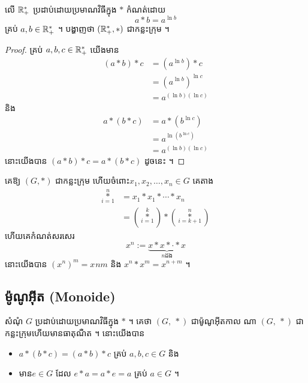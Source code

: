 \begin{example}
លើ $\mathbb{R}^{\ast}_{+}$ ប្រដាប់ដោយប្រមាណវិធីក្នុង $\ast$ កំណត់ដោយ
\[
a\ast b=a^{\ln b}
\]
គ្រប់ $a,b\in \mathbb{R}^{\ast}_{+}$ ។ បង្ហាញថា $(\mathbb{R}^{\ast}_{+}, \ast)$
ជាកន្លះក្រុម ។
\end{example}
\begin{proof}
គ្រប់ $a,b,c\in \mathbb{R}^{\ast}_{+}$ យើងមាន
\begin{align*}
(a\ast b)\ast c&=(a^{\ln b})\ast c\\
&= \left(a^{\ln b}\right)^{\ln c}\\
&= a^{(\ln b)(\ln c)}
\end{align*}
និង 
\begin{align*}
a*(b*c)&=a*(b^{\ln c})\\
&=a^{\ln (b^{\ln c})}\\
&=a^{(\ln b)(\ln c)}
\end{align*}
នោះយើងបាន $(a\ast b)\ast c=a\ast (b\ast c)$ ដូចនេះ
 ។
\end{proof}

\newpage
គេឱ្យ $(G,*)$ ជាកន្លះក្រុម ហើយចំពោះ ​$x_1,x_2,\dots,x_n\in G$ គេតាង
\begin{align*}
\mathop{\ast}\limits_{i=1}^{n}&=x_1*x_1*\cdots*x_n\\
&=\left(\mathop{\ast}\limits_{i=1}^{k}\right)*
\left(\mathop{\ast}\limits_{i=k+1}^{n}\right)
\end{align*}
ហើយគេកំណត់សរសេរ
\[
x^n := \underbrace{x*x*\cdot *x}_{n \text{ដង}}
\]
នោះយើងបាន $(x^{n})^m=x^{}nm$ និង $x^n*x^m=x^{n+m}$ ។

\subsection{ម៉ូណូអុីត (Monoide)}
\begin{definition}
សំណុំ $G$ ប្រដាប់ដោយប្រមាណវិធីក្នុង $*$ ។ គេថា $(G,~*)$ ជាម៉ូណូអុីតកាល ណា 
$(G,~*)$ ជាកន្លះក្រុមហើយមានធាតុណឺត ។ នោះយើងបាន
\begin{itemize}
\item $a*(b*c)=(a*b)*c$ គ្រប់ $a,b,c\in G$ និង
\item មាន ​$e\in G$ ដែល $e*a=a*e=a$ គ្រប់ $a\in G$ ។
\end{itemize}
\end{definition}

